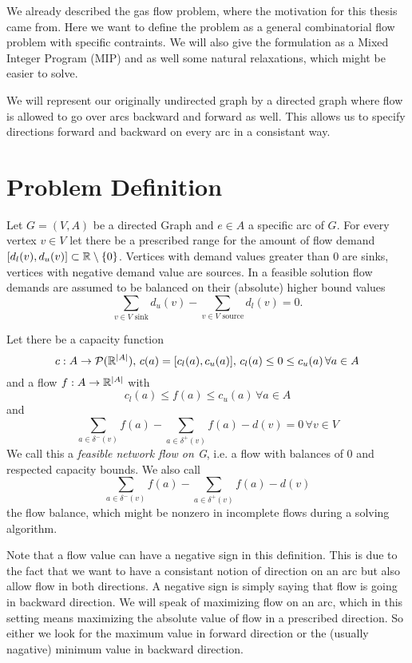 We already described the gas flow problem, where the motivation for this thesis came from. Here we want to define the 
problem as a general combinatorial flow problem with specific contraints. We will also give the formulation as a Mixed 
Integer Program (MIP) and as well some natural relaxations, which might be easier to solve.

We will represent our originally undirected graph by a directed graph where flow is allowed to go over arcs backward 
and forward as well. This allows us to specify directions forward and backward on every arc in a consistant way. 
\section{Problem Definition}

\begin{definition}
 Let $G=(V,A)$ be a directed Graph and $e \in A$ a specific arc of $G$. For every vertex $v\in V$ let there be a 
prescribed range for the amount of flow demand $[d_l(v), d_u(v)]\subset \mathbb{R} \setminus \{0\}$. Vertices with demand 
values greater than 0 are sinks, vertices with negative demand value are sources. In a feasible solution flow 
demands are assumed to be balanced on their (absolute) higher bound values 
$$\sum_{v \in V\textrm{ sink}}d_u(v)-\sum_{v \in V\textrm{ source}}d_l(v)=0.$$ 

Let there be a capacity function 
$$c:A\to \mathcal{P}(\mathbb{R}^{|A|}), \, c(a)=[c_l(a), c_u(a)],\, c_l(a)\le 0 \le c_u(a) \, \forall a\in A$$
and a flow  $f: A\to\mathbb{R}^{|A|} $ with $$c_l(a)\le f(a)\le 
c_u(a)\, \forall a\in A$$ and $$\sum_{a\in\delta^-(v)}f(a)-\sum_{a\in\delta^+(v)}f(a)-d(v) = 0 \, \forall v\in V$$
We call this a \textit{feasible network flow on G}, i.e. a flow with balances of 0 and respected capacity bounds.
We also call $$\sum_{a\in \delta^-(v)}f(a)-\sum_{a\in\delta^+(v)}f(a)-d(v)$$ the flow balance, which might be nonzero 
in incomplete flows during a solving algorithm.\\
\end{definition}
Note that a flow value can have a negative sign in this definition. This is due to the fact that we want to have a 
consistant notion of direction on an arc but also allow flow in both directions. A negative sign is simply saying that 
flow is going in backward direction. We will speak of maximizing flow on an arc, which in this setting means maximizing 
the absolute value of flow in a prescribed direction. So either we look for the maximum value in forward direction or 
the (usually nagative) minimum value in backward direction.\\

